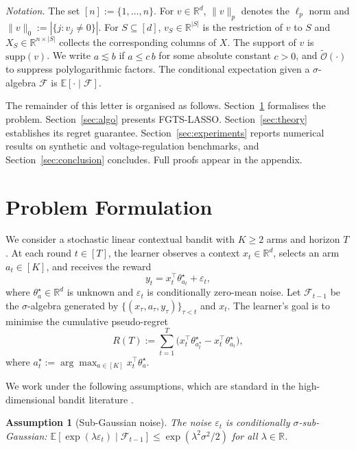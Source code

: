 \documentclass[10pt,journal,twoside,twocolumn]{IEEEtran}
\newtheorem{assumption}{Assumption}
\begin{document}
\textit{Notation.} The set $[n] := \{1,\dots,n\}$. For $v \in \mathbb{R}^d$, $\|v\|_p$ denotes the $\ell_p$ norm and $\|v\|_0 := |\{j: v_j \neq 0\}|$. For $S \subseteq [d]$, $v_S \in \mathbb{R}^{|S|}$ is the restriction of $v$ to $S$ and $X_S \in \mathbb{R}^{n \times |S|}$ collects the corresponding columns of $X$. The support of $v$ is $\mathrm{supp}(v)$. We write $a \lesssim b$ if $a \leq c\, b$ for some absolute constant $c > 0$, and $\tilde{\mathcal{O}}(\cdot)$ to suppress polylogarithmic factors. The conditional expectation given a $\sigma$-algebra $\mathcal{F}$ is $\mathbb{E}[\cdot \mid \mathcal{F}]$.

The remainder of this letter is organised as follows. Section~\ref{sec:problem} formalises the problem. Section~\ref{sec:algo} presents FGTS-LASSO. Section~\ref{sec:theory} establishes its regret guarantee. Section~\ref{sec:experiments} reports numerical results on synthetic and voltage-regulation benchmarks, and Section~\ref{sec:conclusion} concludes. Full proofs appear in the appendix.

\section{Problem Formulation}\label{sec:problem}

We consider a stochastic linear contextual bandit with $K \geq 2$ arms and horizon $T$. At each round $t \in [T]$, the learner observes a context $x_t \in \mathbb{R}^d$, selects an arm $a_t \in [K]$, and receives the reward
\begin{equation}
y_t = x_t^\top \theta^{\star}_{a_t} + \varepsilon_t,
\label{eq:model}
\end{equation}
where $\theta^{\star}_a \in \mathbb{R}^d$ is unknown and $\varepsilon_t$ is conditionally zero-mean noise. Let $\mathcal{F}_{t-1}$ be the $\sigma$-algebra generated by $\{(x_\tau, a_\tau, y_\tau)\}_{\tau<t}$ and $x_t$. The learner's goal is to minimise the cumulative pseudo-regret
\begin{equation}
R(T) := \sum_{t=1}^T \big( x_t^\top \theta^{\star}_{a_t^{\star}} - x_t^\top \theta^{\star}_{a_t} \big),
\label{eq:regret}
\end{equation}
where $a_t^{\star} := \arg\max_{a \in [K]} x_t^\top \theta^{\star}_a$.

We work under the following assumptions, which are standard in the high-dimensional bandit literature \cite{bastani2020online,oh2021sparsity,hao2020high}.

\begin{assumption}[Sub-Gaussian noise]\label{ass:noise}
The noise $\varepsilon_t$ is conditionally $\sigma$-sub-Gaussian: $\mathbb{E}[\exp(\lambda \varepsilon_t) \mid \mathcal{F}_{t-1}] \leq \exp(\lambda^2 \sigma^2 / 2)$ for all $\lambda \in \mathbb{R}$.
\end{assumption}
\end{document}
